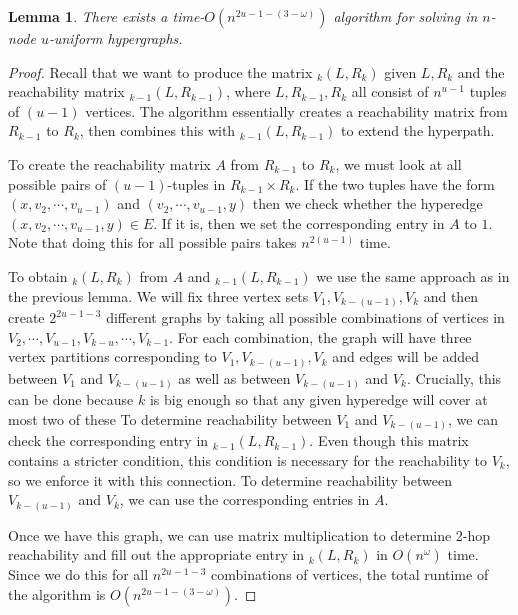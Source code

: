 \documentclass[11pt,letterpaper,pdftex]{article}
\newtheorem{lemma}[theorem]{Lemma}
\begin{document}
\begin{lemma} \label{lem: uCLR algorithm}
    There exists a time-$O(n^{2u-1-(3-\omega)})$ algorithm for solving  in $n$-node $u$-uniform hypergraphs.
\end{lemma}
\begin{proof}
    Recall that we want to produce the matrix \uCLR$_k(L,R_k)$ given $L,R_k$ and the reachability matrix \uCLR$_{k-1}(L,R_{k-1})$, where $L,R_{k-1},R_k$ all consist of $n^{u-1}$ tuples of $(u-1)$ vertices.
    The algorithm essentially creates a reachability matrix from $R_{k-1}$ to $R_k$, then combines this with \uCLR$_{k-1}(L,R_{k-1})$ to extend the hyperpath.

    To create the reachability matrix $A$ from $R_{k-1}$ to $R_{k}$, we must look at all possible pairs of $(u-1)$-tuples in $R_{k-1} \times R_k$.
    If the two tuples have the form $(x,v_2, \cdots, v_{u-1})$ and $(v_2, \cdots, v_{u-1},y)$ then we check whether the hyperedge $(x, v_2, \cdots, v_{u-1},y) \in E$.
    If it is, then we set the corresponding entry in $A$ to $1$.
    Note that doing this for all possible pairs takes $n^{2(u-1)}$ time.

    To obtain \uCLR$_k(L,R_k)$ from $A$ and \uCLR$_{k-1}(L,R_{k-1})$ we use the same approach as in the previous lemma.
    We will fix three vertex sets $V_1,V_{k-(u-1)},V_k$ and then create $2^{2u-1-3}$ different graphs by taking all possible combinations of vertices in $V_2, \cdots, V_{u-1},V_{k-u}, \cdots, V_{k-1}$.
    For each combination, the graph will have three vertex partitions corresponding to $V_1,V_{k-(u-1)},V_k$ and edges will be added between $V_1$ and $V_{k-(u-1)}$ as well as between $V_{k-(u-1)}$ and $V_k$.
    Crucially, this can be done because $k$ is big enough so that any given hyperedge will cover at most two of these 
    To determine reachability between $V_1$ and $V_{k-(u-1)}$, we can check the corresponding entry in \uCLR$_{k-1}(L,R_{k-1})$.
    Even though this matrix contains a stricter condition, this condition is necessary for the reachability to $V_k$, so we enforce it with this connection.
    To determine reachability between $V_{k-(u-1)}$ and $V_k$, we can use the corresponding entries in $A$.

    Once we have this graph, we can use matrix multiplication to determine 2-hop reachability and fill out the appropriate entry in \uCLR$_k(L,R_k)$ in $O(n^{\omega})$ time. 
    Since we do this for all $n^{2u-1-3}$ combinations of vertices, the total runtime of the algorithm is $O(n^{2u-1-(3-\omega)})$.
\end{proof}
\end{document}

